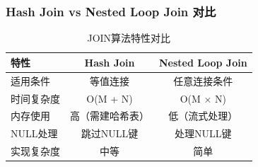 \documentclass[a4paper, 12pt]{article}
\begin{document}
\subsubsection*{Hash Join vs Nested Loop Join 对比}
\begin{table}[h]
\centering
\begin{tabular}{|l|c|c|}
\hline
\textbf{特性} & \textbf{Hash Join} & \textbf{Nested Loop Join} \\
\hline
适用条件 & 等值连接 & 任意连接条件 \\
时间复杂度 & O(M + N) & O(M × N) \\
内存使用 & 高（需建哈希表） & 低（流式处理） \\
NULL处理 & 跳过NULL键 & 处理NULL键 \\
实现复杂度 & 中等 & 简单 \\
\hline
\end{tabular}
\caption{JOIN算法特性对比}
\end{table}
\end{document}
